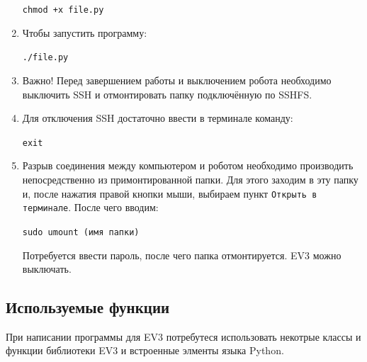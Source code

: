 \documentclass[12pt,a4paper,openany]{extarticle}
\begin{document}
\begin{enumerate}
\verb|chmod +x file.py|\

\item Чтобы запустить программу:

\verb|./file.py|\

\item Важно! Перед завершением работы и выключением робота необходимо выключить SSH и отмонтировать папку подключённую по SSHFS.

\item Для отключения SSH достаточно ввести в терминале команду:

\verb|exit|\

\item Разрыв соединения между компьютером и роботом необходимо производить непосредственно из примонтированной папки. Для этого заходим в эту папку и, после нажатия правой кнопки мыши, выбираем пункт \verb|Открыть в терминале|. После чего вводим:

\verb|sudo umount (имя папки)|\

 Потребуется ввести пароль, после чего папка отмонтируется. EV3 можно выключать.
\end{enumerate}

\subsection{Используемые функции}
\hspace*{\parindent}При написании программы для EV3 потребутеся использовать некотрые классы и функции библиотеки EV3 и встроенные элменты языка Python.
\end{document}

